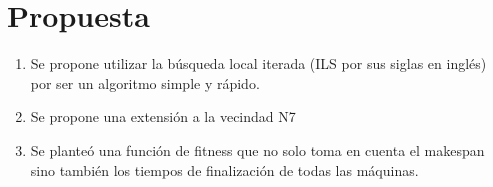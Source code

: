 \section{Propuesta}
\begin{enumerate}
\item Se propone utilizar la búsqueda local iterada (ILS por sus siglas en inglés) por ser un algoritmo simple y rápido.
\item Se propone una extensión a la vecindad N7
\item Se planteó una función de fitness que no solo toma en  cuenta el makespan sino también los tiempos de finalización de todas las máquinas.
\end{enumerate}
